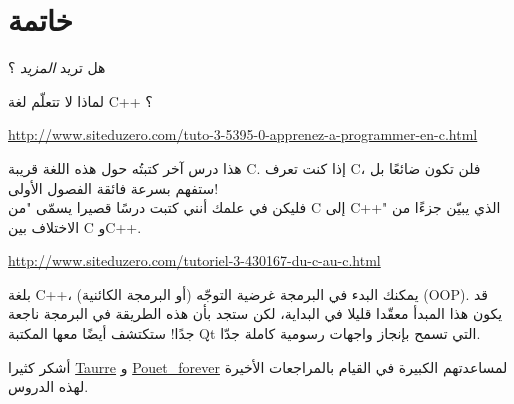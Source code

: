 \chapter*{خاتمة}

هل تريد
\textit{المزيد}
؟

لماذا لا تتعلّم لغة \textenglish{C++}
؟

\url{http://www.siteduzero.com/tuto-3-5395-0-apprenez-a-programmer-en-c.html}

 هذا درس آخر كتبتُه حول هذه اللغة قريبة \textenglish{C}.
 إذا كنت تعرف \textenglish{C}،
فلن تكون ضائعًا بل ستفهم بسرعة فائقة الفصول الأولى!\\
فليكن في علمك أنني كتبت درسًا قصيرا يسمّى "من \textenglish{C}
إلى \textenglish{C++}"
الذي يبيّن جزءًا من الاختلاف بين \textenglish{C}
و\textenglish{C++}.

\url{http://www.siteduzero.com/tutoriel-3-430167-du-c-au-c.html}

بلغة \textenglish{C++}،
يمكنك البدء في البرمجة غرضية التوجّه (أو البرمجة الكائنية) (\textenglish{OOP}).
قد يكون هذا المبدأ معقّدا قليلا في البداية، لكن ستجد بأن هذه الطريقة في البرمجة ناجعة جدًا! ستكتشف أيضًا معها المكتبة
\textenglish{Qt}
التي تسمح بإنجاز واجهات رسومية كاملة جدّا.

أشكر كثيرا
\href{http://www.siteduzero.com/membres-294-45753.html}{Taurre}
و
\href{http://www.siteduzero.com/membres-294-181268.html}{Pouet\_forever}
لمساعدتهم الكبيرة في القيام بالمراجعات الأخيرة لهذه الدروس.
